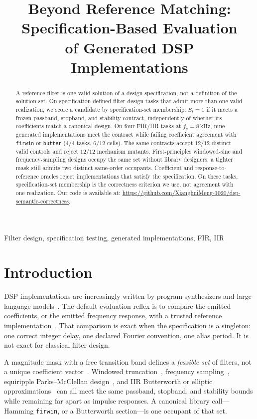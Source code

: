 \documentclass{article}
\title{Beyond Reference Matching: Specification-Based Evaluation\\
of Generated DSP Implementations}
\begin{document}
\maketitle

\begin{abstract}
A reference filter is one valid solution of a design specification, not
a definition of the solution set.
On specification-defined filter-design tasks that admit more than one
valid realization, we score a candidate by specification-set
membership: $S_t=1$ if it meets a frozen passband, stopband, and
stability contract, independently of whether its coefficients match a
canonical design.
On four FIR/IIR tasks at $f_s=8\,\mathrm{kHz}$, nine generated
implementations meet the contract while failing coefficient agreement
with \texttt{firwin} or \texttt{butter} ($4/4$ tasks, $6/12$ cells).
The same contracts accept $12/12$ distinct valid controls and reject
$12/12$ mechanism mutants.
First-principles windowed-sinc and frequency-sampling designs occupy
the same set without library designers; a tighter mask still admits
two distinct same-order occupants.
Coefficient and response-to-reference oracles reject implementations
that satisfy the specification.
On these tasks, specification-set membership is the correctness
criterion we use, not agreement with one realization.
Our code is available at:
\url{https://github.com/XianghuiMeng-1020/dsp-semantic-correctness}.
\end{abstract}

\begin{keywords}
Filter design, specification testing, generated implementations, FIR, IIR
\end{keywords}

\section{Introduction}
\label{sec:intro}

DSP implementations are increasingly written by program synthesizers
and large language models~\cite{chen2021codex,liu2023evalplus}.
The default evaluation reflex is to compare the emitted coefficients,
or the emitted frequency response, with a trusted reference
implementation~\cite{virtanen2020scipy,huuhtanen2015dsp}.
That comparison is exact when the specification is a singleton: one
correct integer delay, one declared Fourier convention, one alias
period.
It is not exact for classical filter design.

A magnitude mask with a free transition band defines a
\emph{feasible set} of filters, not a unique coefficient
vector~\cite{oppenheim2010dsp,proakis2007dsp,mitra2011dsp,rabiner1975theory}.
Windowed truncation~\cite{kaiser1974window,harris1978windows},
frequency sampling~\cite{rabiner1970freqsamp},
equiripple Parks--McClellan design~\cite{parks1972chebyshev,mcclellan1973computer,rabiner1975fir,herrmann1973linear},
and IIR Butterworth or elliptic approximations~\cite{butterworth1930,constantinides1970,jackson1996filters,antoniou2006filters,vaidyanathan1993multirate}
can all meet the same passband, stopband, and stability bounds while
remaining far apart as impulse responses.
A canonical library call---Hamming \texttt{firwin}, or a Butterworth
section---is one occupant of that set.
\end{document}

